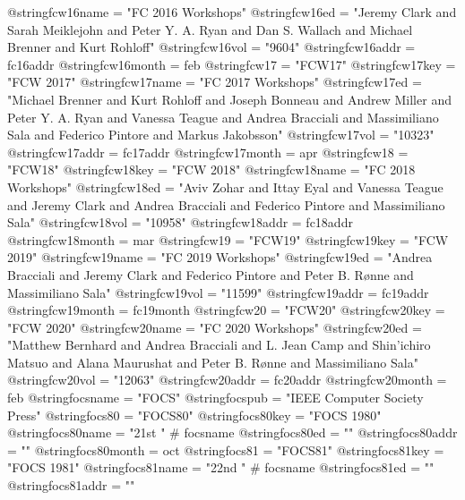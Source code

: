 @string{fcw16name =             "FC 2016 Workshops"}
@string{fcw16ed =               "Jeremy Clark and Sarah Meiklejohn and Peter Y. A. Ryan and Dan S. Wallach and Michael Brenner and Kurt Rohloff"}
@string{fcw16vol =              "9604"}
@string{fcw16addr =             fc16addr}
@string{fcw16month =            feb}
@string{fcw17 =                 "FCW17"}
@string{fcw17key =              "FCW 2017"}
@string{fcw17name =             "FC 2017 Workshops"}
@string{fcw17ed =               "Michael Brenner and Kurt Rohloff and Joseph Bonneau and Andrew Miller and Peter Y. A. Ryan and Vanessa Teague and Andrea Bracciali and Massimiliano Sala and Federico Pintore and Markus Jakobsson"}
@string{fcw17vol =              "10323"}
@string{fcw17addr =             fc17addr}
@string{fcw17month =            apr}
@string{fcw18 =                 "FCW18"}
@string{fcw18key =              "FCW 2018"}
@string{fcw18name =             "FC 2018 Workshops"}
@string{fcw18ed =               "Aviv Zohar and Ittay Eyal and Vanessa Teague and Jeremy Clark and Andrea Bracciali and Federico Pintore and Massimiliano Sala"}
@string{fcw18vol =              "10958"}
@string{fcw18addr =             fc18addr}
@string{fcw18month =            mar}
@string{fcw19 =                 "FCW19"}
@string{fcw19key =              "FCW 2019"}
@string{fcw19name =             "FC 2019 Workshops"}
@string{fcw19ed =               "Andrea Bracciali and Jeremy Clark and Federico Pintore and Peter B. R{\o}nne and Massimiliano Sala"}
@string{fcw19vol =              "11599"}
@string{fcw19addr =             fc19addr}
@string{fcw19month =            fc19month}
@string{fcw20 =                 "FCW20"}
@string{fcw20key =              "FCW 2020"}
@string{fcw20name =             "FC 2020 Workshops"}
@string{fcw20ed =               "Matthew Bernhard and Andrea Bracciali and L. Jean Camp and Shin'ichiro Matsuo and Alana Maurushat and Peter B. R{\o}nne and Massimiliano Sala"}
@string{fcw20vol =              "12063"}
@string{fcw20addr =             fc20addr}
@string{fcw20month =            feb}
@string{focsname =              "FOCS"}
@string{focspub =               "{IEEE} Computer Society Press"}
@string{focs80 =                "FOCS80"}
@string{focs80key =             "FOCS 1980"}
@string{focs80name =            "21st " # focsname}
@string{focs80ed =              ""}
@string{focs80addr =            ""}
@string{focs80month =           oct}
@string{focs81 =                "FOCS81"}
@string{focs81key =             "FOCS 1981"}
@string{focs81name =            "22nd " # focsname}
@string{focs81ed =              ""}
@string{focs81addr =            ""}
